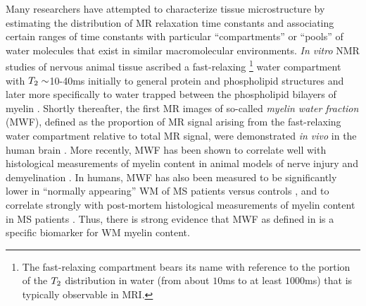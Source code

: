 Many researchers have attempted 
to characterize tissue microstructure
by estimating the distribution
of MR relaxation time constants
and associating certain ranges of time constants
with particular ``compartments'' or ``pools'' of water molecules
that exist in similar macromolecular environments.
\emph{In vitro} NMR studies
of nervous animal tissue
ascribed a fast-relaxing
\footnote{%
	The fast-relaxing compartment bears its name 
	with reference to the portion 
	of the $T_2$ distribution in water
	(from about $10$ms to at least $1000$ms)
	that is typically observable in MRI.
}
water compartment
with $T_2\sim$10-40ms 
initially to general protein 
and phospholipid structures \cite{vasilescu:78:wci}
and later more specifically
to water trapped between
the phospholipid bilayers 
of myelin
\cite{menon:91:aoc, stewart:93:ssr}.
Shortly thereafter,
the first MR images 
of so-called \emph{myelin water fraction} (MWF),
defined as the proportion of MR signal 
arising from the fast-relaxing water compartment
relative to total MR signal,
were demonstrated \emph{in vivo}
in the human brain \cite{mackay:94:ivv}.
More recently,
MWF has been shown 
to correlate well 
with histological measurements
of myelin content 
in animal models
of nerve injury \cite{gareau:00:mta}
and demyelination \cite{webb:03:imt}.
In humans, 
MWF has also been measured 
to be significantly lower
in ``normally appearing'' WM 
of MS patients versus controls \cite{laule:04:wca},
and to correlate strongly 
with post-mortem histological measurements
of myelin content
in MS patients \cite{laule:06:mwi}.
Thus,
there is strong evidence
that MWF as defined in \cite{mackay:94:ivv}
is a specific biomarker
for WM myelin content.

